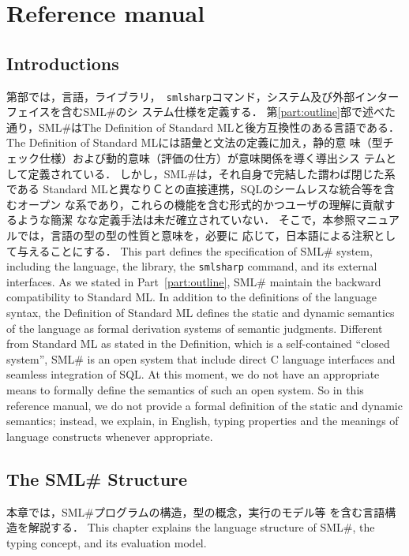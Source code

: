 \documentclass{jbook}
\newcommand{\txt}[2]{#2}
\newcommand{\smlsharp}{SML\#}
\begin{document}
\part{\txt{参照マニュアル}{Reference manual}}
\label{part:referenceManual}
        
\chapter{\txt{はじめに}{Introductions}}

\ifjp%
	第\ref{part:referenceManual}部では，言語，ライブラリ，{\tt
smlsharp}コマンド，システム及び外部インターフェイスを含む\smlsharp{}のシ
ステム仕様を定義する．
	第\ref{part:outline}部で述べた通り，\smlsharp{}はThe Definition
of Standard ML\cite{sml}と後方互換性のある言語である．
	The Definition of Standard MLには語彙と文法の定義に加え，静的意
味（型チェック仕様）および動的意味（評価の仕方）が意味関係を導く導出シス
テムとして定義されている．
	しかし，\smlsharp{}は，それ自身で完結した謂わば閉じた系である
Standard MLと異なりＣとの直接連携，SQLのシームレスな統合等を含むオープン
な系であり，これらの機能を含む形式的かつユーザの理解に貢献するような簡潔
なな定義手法は未だ確立されていない．
	そこで，本参照マニュアルでは，言語の型の型の性質と意味を，必要に
応じて，日本語による注釈として与えることにする．
\else%
	This part defines the specification of \smlsharp{} system,
including the language, the library, the {\tt smlsharp} command, and its 
external interfaces.
	As we stated in Part~\ref{part:outline}, \smlsharp{} maintain
the backward compatibility to Standard ML.
	 In addition to the definitions of the language syntax, the
Definition of Standard ML \cite{sml} defines the static and dynamic
semantics of the language as formal derivation systems of semantic
judgments.
	Different from Standard ML as stated in the Definition, which is
a self-contained ``closed system'', \smlsharp{} is an open system that
include direct C language interfaces and seamless integration of SQL.
	At this moment, we do not have an appropriate means to formally
define the semantics of such an open system.
	So in this reference manual, we do not provide a formal
definition of the static and dynamic semantics; instead, we explain, in
English, typing properties and the meanings of language constructs
whenever appropriate.
\fi%


\chapter{\txt{\smlsharp{}の構造}{The \smlsharp{} Structure}}
\ifjp%
	本章では，\smlsharp{}プログラムの構造，型の概念，実行のモデル等
を含む言語構造を解説する．
\else%
	This chapter explains the language structure of \smlsharp{},
the typing concept, and its evaluation model.
\fi%
\end{document}
